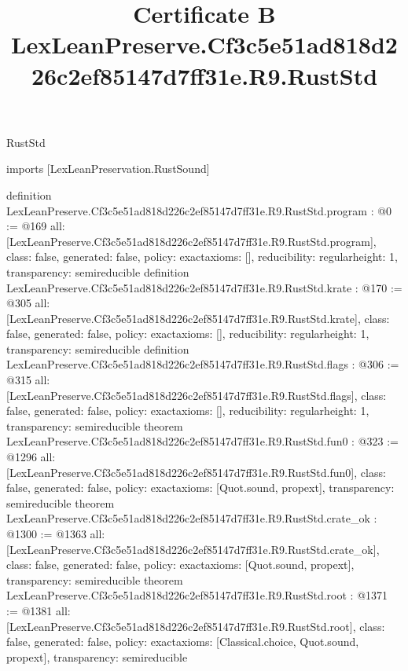 \begin{lexlean}{RustStd}
\title{Certificate B LexLeanPreserve.Cf3c5e51ad818d226c2ef85147d7ff31e.R9.RustStd}
\begin{coremodule}
imports [LexLeanPreservation.RustSound]

definition LexLeanPreserve.Cf3c5e51ad818d226c2ef85147d7ff31e.R9.RustStd.program : @0 := @169 {
  all: [LexLeanPreserve.Cf3c5e51ad818d226c2ef85147d7ff31e.R9.RustStd.program],
  class: false,
  generated: false,
  policy: exact{axioms: []},
  reducibility: regular{height: 1},
  transparency: semireducible
}
definition LexLeanPreserve.Cf3c5e51ad818d226c2ef85147d7ff31e.R9.RustStd.krate : @170 := @305 {
  all: [LexLeanPreserve.Cf3c5e51ad818d226c2ef85147d7ff31e.R9.RustStd.krate],
  class: false,
  generated: false,
  policy: exact{axioms: []},
  reducibility: regular{height: 1},
  transparency: semireducible
}
definition LexLeanPreserve.Cf3c5e51ad818d226c2ef85147d7ff31e.R9.RustStd.flags : @306 := @315 {
  all: [LexLeanPreserve.Cf3c5e51ad818d226c2ef85147d7ff31e.R9.RustStd.flags],
  class: false,
  generated: false,
  policy: exact{axioms: []},
  reducibility: regular{height: 1},
  transparency: semireducible
}
theorem LexLeanPreserve.Cf3c5e51ad818d226c2ef85147d7ff31e.R9.RustStd.fun0 : @323 := @1296 {
  all: [LexLeanPreserve.Cf3c5e51ad818d226c2ef85147d7ff31e.R9.RustStd.fun0],
  class: false,
  generated: false,
  policy: exact{axioms: [Quot.sound, propext]},
  transparency: semireducible
}
theorem LexLeanPreserve.Cf3c5e51ad818d226c2ef85147d7ff31e.R9.RustStd.crate_ok : @1300 := @1363 {
  all: [LexLeanPreserve.Cf3c5e51ad818d226c2ef85147d7ff31e.R9.RustStd.crate_ok],
  class: false,
  generated: false,
  policy: exact{axioms: [Quot.sound, propext]},
  transparency: semireducible
}
theorem LexLeanPreserve.Cf3c5e51ad818d226c2ef85147d7ff31e.R9.RustStd.root : @1371 := @1381 {
  all: [LexLeanPreserve.Cf3c5e51ad818d226c2ef85147d7ff31e.R9.RustStd.root],
  class: false,
  generated: false,
  policy: exact{axioms: [Classical.choice, Quot.sound, propext]},
  transparency: semireducible
}


\end{coremodule}
\end{lexlean}
